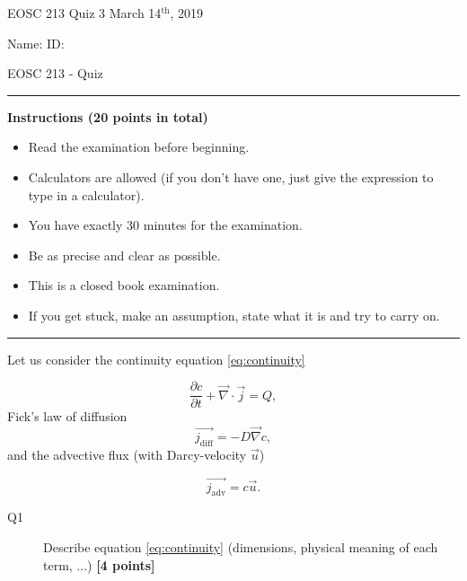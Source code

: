 \documentclass{article}
\begin{document}
\pagestyle{empty}

\large{EOSC 213 Quiz 3} \hspace{10cm} \large{March 14$^{\textrm{th}}$, 2019}

\large{Name:} \hspace{12cm} \large{ID: }
\begin{center}
\Huge{EOSC 213 - Quiz}
\end{center}

\rule{\textwidth}{1pt}

\large{\textbf{Instructions (20 points in total)}}
\begin{multicols}{2}
\begin{itemize}
\item Read the examination before beginning.
\item Calculators are allowed (if you don't have one, just give the expression to type in a calculator).
\item You have exactly 30 minutes for the examination.
\item Be as precise and clear as possible.
\item This is a closed book examination.
\item If you get stuck, make an assumption, state what it is and try to carry on.
\end{itemize} 
\end{multicols}


\rule{\textwidth}{1pt}


Let us consider the continuity equation \ref{eq:continuity}

\begin{equation}
\frac{\partial c}{\partial t} + \overrightarrow{\nabla} \cdot \overrightarrow{j} = Q, \label{eq:continuity}
\end{equation} Fick's law of diffusion
\begin{equation}
\overrightarrow{j_{\mathrm{diff}}} = - D \overrightarrow{\nabla} c, \label{eq:fick}
\end{equation} and the advective flux (with Darcy-velocity $\overrightarrow{u}$)

\begin{equation}
\overrightarrow{j_{\mathrm{adv}}} = c \overrightarrow{u} . \label{eq:adv}
\end{equation}
\begin{description}
\item [Q1] Describe equation \ref{eq:continuity} (dimensions, physical meaning of each term, ...) \textbf{[4 points]}
\vspace{4cm}
\end{description}
\end{document}
